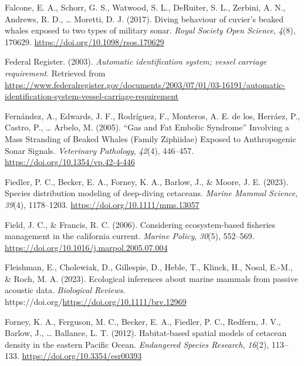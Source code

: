 \documentclass[
]{article}
\newlength{\cslhangindent}
\newlength{\cslentryspacingunit} %
\newenvironment{CSLReferences}[2] %
 {%
  \setlength{\parindent}{0pt}
  \ifodd #1
  \let\oldpar\par
  \def\par{\hangindent=\cslhangindent\oldpar}
  \fi
  \setlength{\parskip}{#2\cslentryspacingunit}
 }%
 {}
\begin{document}
\begin{CSLReferences}{1}{0}
\leavevmode{}%
Falcone, E. A., Schorr, G. S., Watwood, S. L., DeRuiter, S. L., Zerbini,
A. N., Andrews, R. D., \ldots{} Moretti, D. J. (2017). Diving behaviour
of cuvier's beaked whales exposed to two types of military sonar.
\emph{Royal Society Open Science}, \emph{4}(8), 170629.
\url{https://doi.org/10.1098/rsos.170629}

\leavevmode{}%
Federal Register. (2003). \emph{Automatic identification system; vessel
carriage requirement}. Retrieved from
\url{https://www.federalregister.gov/documents/2003/07/01/03-16191/automatic-identification-system-vessel-carriage-requirement}

\leavevmode{}%
Fernández, A., Edwards, J. F., Rodríguez, F., Monteros, A. E. de los,
Herráez, P., Castro, P., \ldots{} Arbelo, M. (2005). {``}Gas and Fat
Embolic Syndrome{''} Involving a Mass Stranding of Beaked Whales (Family
Ziphiidae) Exposed to Anthropogenic Sonar Signals. \emph{Veterinary
Pathology}, \emph{42}(4), 446--457.
\url{https://doi.org/10.1354/vp.42-4-446}

\leavevmode{}%
Fiedler, P. C., Becker, E. A., Forney, K. A., Barlow, J., \& Moore, J.
E. (2023). Species distribution modeling of deep-diving cetaceans.
\emph{Marine Mammal Science}, \emph{39}(4), 1178--1203.
\url{https://doi.org/10.1111/mms.13057}

\leavevmode{}%
Field, J. C., \& Francis, R. C. (2006). Considering ecosystem-based
fisheries management in the california current. \emph{Marine Policy},
\emph{30}(5), 552--569.
\url{https://doi.org/10.1016/j.marpol.2005.07.004}

\leavevmode{}%
Fleishman, E., Cholewiak, D., Gillespie, D., Heble, T., Klinck, H.,
Nosal, E.-M., \& Roch, M. A. (2023). Ecological inferences about marine
mammals from passive acoustic data. \emph{Biological Reviews}.
https://doi.org/\url{https://doi.org/10.1111/brv.12969}

\leavevmode{}%
Forney, K. A., Ferguson, M. C., Becker, E. A., Fiedler, P. C., Redfern,
J. V., Barlow, J., \ldots{} Ballance, L. T. (2012). Habitat-based
spatial models of cetacean density in the eastern Pacific Ocean.
\emph{Endangered Species Research}, \emph{16}(2), 113--133.
\url{https://doi.org/10.3354/esr00393}


\end{CSLReferences}
\end{document}
